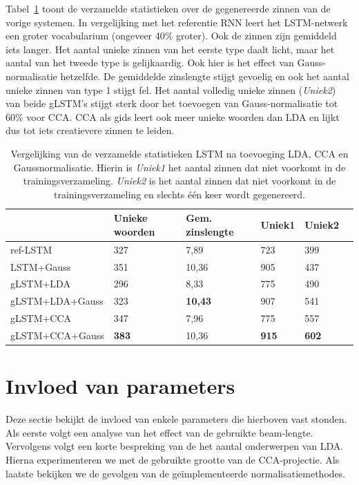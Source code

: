 Tabel~\ref{table:lstm_stats} toont de verzamelde statistieken over de gegenereerde zinnen van de vorige systemen. In vergelijking met het referentie RNN leert het LSTM-netwerk een groter vocabularium (ongeveer 40\% groter). Ook de zinnen zijn gemiddeld iets langer. Het aantal unieke zinnen van het eerste type daalt licht, maar het aantal van het tweede type is gelijkaardig.
Ook hier is het effect van Gauss-normalisatie hetzelfde. De gemiddelde zinslengte stijgt gevoelig en ook het aantal unieke zinnen van type 1 stijgt fel. Het aantal volledig unieke zinnen (\emph{Uniek2}) van beide gLSTM's stijgt sterk door het toevoegen van Gauss-normalisatie tot 60\% voor CCA. CCA als gids leert ook meer unieke woorden dan LDA en lijkt dus tot iets creatievere zinnen te leiden.
    \begin{table}
    	\centering
    	\begin{tabular}{llllll}
    		~                   & Unieke woorden & Gem. zinslengte & Uniek1 & Uniek2 \\ \hline
    		ref-LSTM         				  & 327   & 7,89   & 723   & 399  \\
    		LSTM+Gauss        				  & 351   & 10,36   & 905   & 437  \\
    		gLSTM+LDA         				  & 296   & 8,33   & 775   & 490     \\
    		gLSTM+LDA+Gauss 				  & 323   & \textbf{10,43}   & 907   & 541     \\
    		gLSTM+CCA         				  & 347   & 7,96   & 775   &557   \\
    		gLSTM+CCA+Gauss 				  & \textbf{383}   & 10,36   & \textbf{915}   & \textbf{602}    \\\hline
    	\end{tabular}
	\caption[Vergelijking van de verzamelde statistieken LSTM na toevoeging LDA, CCA en Gaussnormalisatie]{Vergelijking van de verzamelde statistieken LSTM na toevoeging LDA, CCA en Gaussnormalisatie. Hierin is \emph{Uniek1} het aantal zinnen dat niet voorkomt in de trainingsverzameling. \emph{Uniek2} is het aantal zinnen dat niet voorkomt in de trainingsverzameling en slechts \'e\'en keer wordt gegenereerd.}
    	\label{table:lstm_stats}
    \end{table}
    
\section{Invloed van parameters}
\label{sec:invloed-parameters}
Deze sectie bekijkt de invloed van enkele parameters die hierboven vast stonden. Als eerste volgt een analyse van het effect van de gebruikte beam-lengte. Vervolgens volgt een korte bespreking van de het aantal onderwerpen van LDA. Hierna experimenteren we met de gebruikte grootte van de CCA-projectie. Als laatste bekijken we de gevolgen van de ge\"implementeerde normalisatiemethodes.

